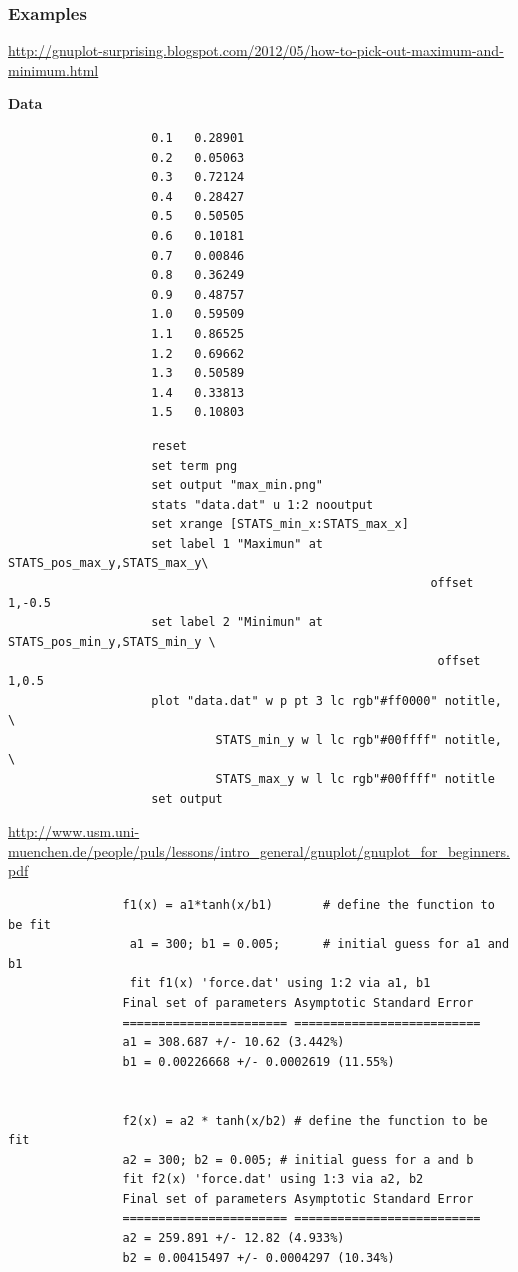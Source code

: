 \documentclass{beamer}
\begin{document}
		\begin{frame}
			\scriptsize
			\frametitle{Examples}
			\url{http://gnuplot-surprising.blogspot.com/2012/05/how-to-pick-out-maximum-and-minimum.html}
			
			\begin{minipage}{.25\textwidth}
				\textbf{Data}
				\begin{verbatim}
					0.1   0.28901
					0.2   0.05063
					0.3   0.72124
					0.4   0.28427
					0.5   0.50505
					0.6   0.10181
					0.7   0.00846
					0.8   0.36249
					0.9   0.48757
					1.0   0.59509
					1.1   0.86525
					1.2   0.69662
					1.3   0.50589
					1.4   0.33813
					1.5   0.10803
				\end{verbatim}
			\end{minipage}
			\begin{minipage}{.48\textwidth}
				\begin{verbatim}
					reset
					set term png
					set output "max_min.png"
					stats "data.dat" u 1:2 nooutput
					set xrange [STATS_min_x:STATS_max_x]
					set label 1 "Maximun" at STATS_pos_max_y,STATS_max_y\ 
					                                       offset 1,-0.5
					set label 2 "Minimun" at STATS_pos_min_y,STATS_min_y \
					                                        offset 1,0.5
					plot "data.dat" w p pt 3 lc rgb"#ff0000" notitle, \
					         STATS_min_y w l lc rgb"#00ffff" notitle, \
 					         STATS_max_y w l lc rgb"#00ffff" notitle
					set output
				\end{verbatim}
			\end{minipage}
			\vspace{2cm}
			
			
			\url{http://www.usm.uni-muenchen.de/people/puls/lessons/intro_general/gnuplot/gnuplot_for_beginners.pdf}
			\begin{verbatim}
				f1(x) = a1*tanh(x/b1) 		# define the function to be fit
				 a1 = 300; b1 = 0.005; 		# initial guess for a1 and b1
				 fit f1(x) 'force.dat' using 1:2 via a1, b1
				Final set of parameters Asymptotic Standard Error
				======================= ==========================
				a1 = 308.687 +/- 10.62 (3.442%)
				b1 = 0.00226668 +/- 0.0002619 (11.55%)
				
				
				f2(x) = a2 * tanh(x/b2) # define the function to be fit
				a2 = 300; b2 = 0.005; # initial guess for a and b
				fit f2(x) 'force.dat' using 1:3 via a2, b2
				Final set of parameters Asymptotic Standard Error
				======================= ==========================
				a2 = 259.891 +/- 12.82 (4.933%)
				b2 = 0.00415497 +/- 0.0004297 (10.34%) 



\end{verbatim}
\end{frame}
\end{document}
